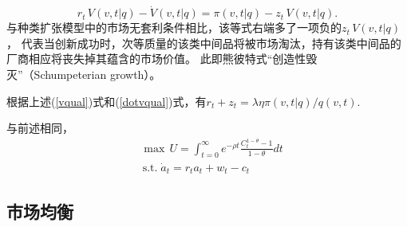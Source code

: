 \documentclass[cn,normal,11pt,black]{elegantnote}
\begin{document}
\begin{definition}[市场无套利条件]
    \begin{equation}\label{noprofitqual}
      r_t \, V(v,t|q) - \dot{V}(v,t|q) = \pi(v,t|q) - z_t \, V(v,t|q). 
    \end{equation}
    与种类扩张模型中的市场无套利条件相比，该等式右端多了一项负的$z_t \, V(v,t|q)$，
    代表当创新成功时，次等质量的该类中间品将被市场淘汰，持有该类中间品的厂商相应将丧失掉其蕴含的市场价值。
    此即熊彼特式“创造性毁灭”（Schumpeterian growth）。
    
    根据上述(\ref{vqual})式和(\ref{dotvqual})式，有$r_t + z_t = \lambda \eta \pi(v,t|q) / q(v,t)$.
\end{definition}
\begin{definition}[个人效用函数]
    与前述相同，
    \begin{align}
        & \max \, U  = \int_{t=0}^{\infty} e^{-\rho t} \frac{C_t^{1-\theta} -1}{1-\theta} dt \\
        & \, \mathrm{s.t.} \; \dot{a}_t =  r_t a_t + w_t - c_t
    \end{align}
\end{definition}


\subsection{市场均衡}
\end{document}
